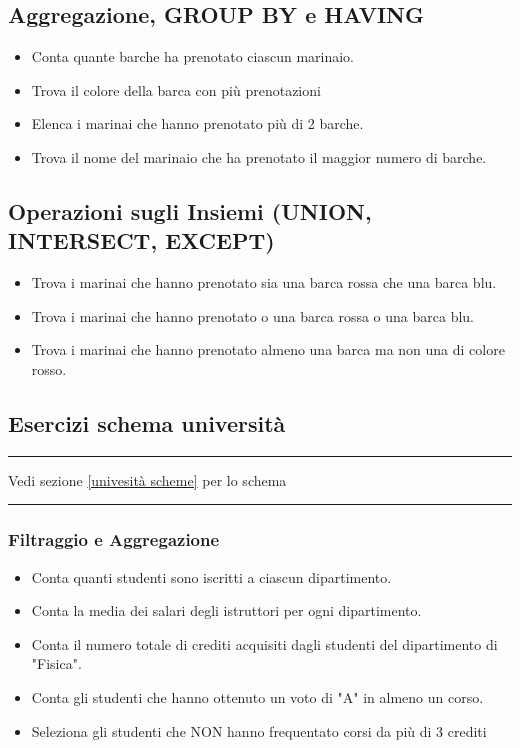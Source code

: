 \subsection*{Aggregazione, GROUP BY e HAVING}
\begin{itemize}
	\item Conta quante barche ha prenotato ciascun marinaio.
	\item Trova il colore della barca con più prenotazioni
	\item Elenca i marinai che hanno prenotato più di 2 barche.
	\item Trova il nome del marinaio che ha prenotato il maggior numero di barche.
\end{itemize}

\subsection*{Operazioni sugli Insiemi (UNION, INTERSECT, EXCEPT)}
\begin{itemize}
	\item Trova i marinai che hanno prenotato sia una barca rossa che una barca blu.
	\item Trova i marinai che hanno prenotato o una barca rossa o una barca blu.
	\item Trova i marinai che hanno prenotato almeno una barca ma non una di colore rosso.
\end{itemize}

\subsection{Esercizi schema università}
\hrule
\vskip3mm
Vedi sezione \ref{univesità scheme} per lo schema
\vskip3mm
\hrule
\vskip3mm
\subsubsection*{Filtraggio e Aggregazione}
\begin{itemize}
	\item Conta quanti studenti sono iscritti a ciascun dipartimento.
	\item Conta la media dei salari degli istruttori per ogni dipartimento.
	\item Conta il numero totale di crediti acquisiti dagli studenti del dipartimento di "Fisica".
	\item Conta gli studenti che hanno ottenuto un voto di "A" in almeno un corso.
	\item Seleziona gli studenti che NON hanno frequentato corsi da più di 3 crediti
\end{itemize}

